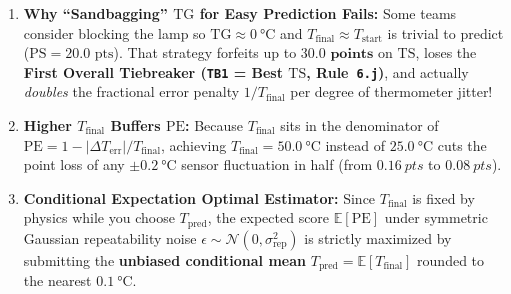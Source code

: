 \begin{twocol}[0.50]
\begin{center}
\label{fig:16:pe-sensitivity}
\end{center}
\nextcol[0.48]
\begin{trapbox}
\begin{enumerate}
  \item \textbf{Why ``Sandbagging'' $\mathrm{TG}$ for Easy Prediction Fails:} Some teams consider blocking the lamp so $\mathrm{TG} \approx \SI{0}{\celsius}$ and $T_{\mathrm{final}} \approx T_{\mathrm{start}}$ is trivial to predict ($\mathrm{PS} = 20.0\text{ pts}$). That strategy forfeits up to $\mathbf{30.0\text{ points}}$ on $\mathrm{TS}$, loses the \textbf{First Overall Tiebreaker (\texttt{TB1} = Best $\mathrm{TS}$, Rule~\texttt{6.j})}, and actually \textit{doubles} the fractional error penalty $1/T_{\mathrm{final}}$ per degree of thermometer jitter!
  \item \textbf{Higher $T_{\mathrm{final}}$ Buffers $\mathrm{PE}$:} Because $T_{\mathrm{final}}$ sits in the denominator of $\mathrm{PE} = 1 - |\Delta T_{\mathrm{err}}|/T_{\mathrm{final}}$, achieving $T_{\mathrm{final}} = \SI{50.0}{\celsius}$ instead of $\SI{25.0}{\celsius}$ cuts the point loss of any $\pm\SI{0.2}{\celsius}$ sensor fluctuation in half (from $\SI{0.16}{pts}$ to $\SI{0.08}{pts}$).
  \item \textbf{Conditional Expectation Optimal Estimator:} Since $T_{\mathrm{final}}$ is fixed by physics while you choose $T_{\mathrm{pred}}$, the expected score $\mathbb{E}[\mathrm{PE}]$ under symmetric Gaussian repeatability noise $\epsilon \sim \mathcal{N}(0, \sigma_{\mathrm{rep}}^2)$ is strictly maximized by submitting the \textbf{unbiased conditional mean} $T_{\mathrm{pred}} = \mathbb{E}[T_{\mathrm{final}}]$ rounded to the nearest $\SI{0.1}{\celsius}$.
\end{enumerate}
\end{trapbox}
\end{twocol}

